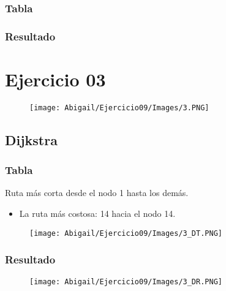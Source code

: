 \documentclass[12pt]{article}
\begin{document}
      \subsubsection{Tabla}

      \subsubsection{Resultado}

  
  \section{Ejercicio 03}
    \begin{figure}[h!]
      \centering
      \texttt{[image: Abigail/Ejercicio09/Images/3.PNG]}
    \end{figure} 

    \subsection{Dijkstra}

      \subsubsection{Tabla}
        Ruta más corta desde el nodo 1 hasta los demás.

        \begin{itemize}
          \item La ruta más costosa: 14 hacia el nodo 14.
        \end{itemize}
        
        \begin{figure}[h!]
          \centering
          \texttt{[image: Abigail/Ejercicio09/Images/3\_DT.PNG]}
        \end{figure} 

      \subsubsection{Resultado}
        \begin{figure}[h!]
          \centering
          \texttt{[image: Abigail/Ejercicio09/Images/3\_DR.PNG]}
        \end{figure} 
\end{document}
